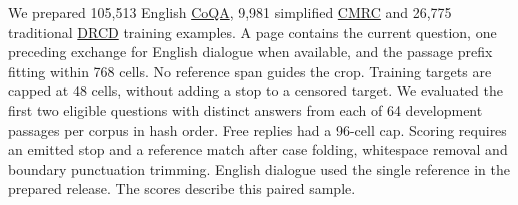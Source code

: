 We prepared 105,513 English \href{https://stanfordnlp.github.io/coqa/}{CoQA}, 9,981 simplified \href{https://aclanthology.org/D19-1600/}{CMRC} and 26,775 traditional \href{https://github.com/DRCKnowledgeTeam/DRCD}{DRCD} training examples. A page contains the current question, one preceding exchange for English dialogue when available, and the passage prefix fitting within 768 cells. No reference span guides the crop. Training targets are capped at 48 cells, without adding a stop to a censored target. We evaluated the first two eligible questions with distinct answers from each of 64 development passages per corpus in hash order. Free replies had a 96-cell cap. Scoring requires an emitted stop and a reference match after case folding, whitespace removal and boundary punctuation trimming. English dialogue used the single reference in the prepared release. The scores describe this paired sample.
